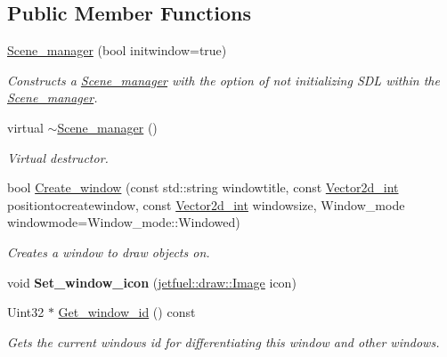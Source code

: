 \subsection*{Public Member Functions}
\begin{DoxyCompactItemize}
\item 
\hyperlink{classjetfuel_1_1draw_1_1Scene__manager_ae2b2c07e8d9a7d2fa34b03f4c117e0c9}{Scene\+\_\+manager} (bool initwindow=true)
\begin{DoxyCompactList}\small\item\em Constructs a \hyperlink{classjetfuel_1_1draw_1_1Scene__manager}{Scene\+\_\+manager} with the option of not initializing S\+DL within the \hyperlink{classjetfuel_1_1draw_1_1Scene__manager}{Scene\+\_\+manager}. \end{DoxyCompactList}\item 
virtual \hyperlink{classjetfuel_1_1draw_1_1Scene__manager_a7467d1c52f4185a19a9168fdc6bf6e57}{$\sim$\+Scene\+\_\+manager} ()
\begin{DoxyCompactList}\small\item\em Virtual destructor. \end{DoxyCompactList}\item 
bool \hyperlink{classjetfuel_1_1draw_1_1Scene__manager_a5113e9062c272a22d383ba872417ba31}{Create\+\_\+window} (const std\+::string windowtitle, const \hyperlink{classjetfuel_1_1draw_1_1Vector2d}{Vector2d\+\_\+int} positiontocreatewindow, const \hyperlink{classjetfuel_1_1draw_1_1Vector2d}{Vector2d\+\_\+int} windowsize, Window\+\_\+mode windowmode=Window\+\_\+mode\+::\+Windowed)
\begin{DoxyCompactList}\small\item\em Creates a window to draw objects on. \end{DoxyCompactList}\item 
\mbox{\label{classjetfuel_1_1draw_1_1Scene__manager_aa0d9dfb72077a16099f3b5cb7cf5d27d}} 
void {\bfseries Set\+\_\+window\+\_\+icon} (\hyperlink{classjetfuel_1_1draw_1_1Image}{jetfuel\+::draw\+::\+Image} icon)
\item 
Uint32 $\ast$ \hyperlink{classjetfuel_1_1draw_1_1Scene__manager_a1758a86d40dcfaface8958fcd33676bf}{Get\+\_\+window\+\_\+id} () const
\begin{DoxyCompactList}\small\item\em Gets the current window\textquotesingle{}s id for differentiating this window and other windows. \end{DoxyCompactList}\item 

\end{DoxyCompactItemize}
